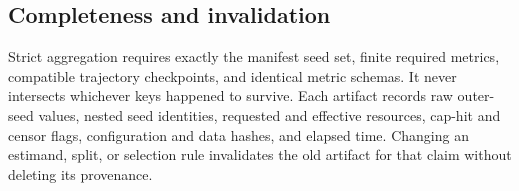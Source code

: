 \subsection{Completeness and invalidation}

Strict aggregation requires exactly the manifest seed set, finite required
metrics, compatible trajectory checkpoints, and identical metric schemas. It
never intersects whichever keys happened to survive. Each artifact records raw
outer-seed values, nested seed identities, requested and effective resources,
cap-hit and censor flags, configuration and data hashes, and elapsed time.
Changing an estimand, split, or selection rule invalidates the old artifact for
that claim without deleting its provenance.

\FloatBarrier
